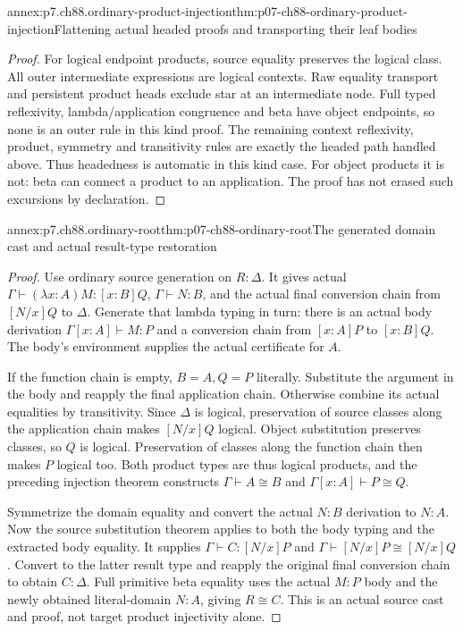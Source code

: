 \begin{annexitem}{annex:p7.ch88.ordinary-product-injection}{thm:p07-ch88-ordinary-product-injection}{Flattening actual headed proofs and transporting their leaf bodies}
\begin{proof}
For logical endpoint products, source equality preserves the logical
class. All outer intermediate expressions are logical contexts.
Raw equality transport and persistent product heads exclude star
at an intermediate node. Full typed reflexivity, lambda/application
congruence and beta have object endpoints, so none is an outer rule
in this kind proof. The remaining context reflexivity, product,
symmetry and transitivity rules are exactly the headed path handled
above. Thus headedness is automatic in this kind case. For object
products it is not: beta can connect a product to an application.
The proof has not erased such excursions by declaration.
\end{proof}
\end{annexitem}

\begin{annexitem}{annex:p7.ch88.ordinary-root}{thm:p07-ch88-ordinary-root}{The generated domain cast and actual result-type restoration}
\begin{proof}
Use ordinary source generation on \(R:\Delta\). It gives actual
\(\Gamma\vdash(\lambda x:A)M:[x:B]Q\),
\(\Gamma\vdash N:B\), and the actual final conversion chain from
\([N/x]Q\) to \(\Delta\). Generate that lambda typing in turn:
there is an actual body derivation \(\Gamma[x:A]\vdash M:P\)
and a conversion chain from \([x:A]P\) to \([x:B]Q\).
The body's environment supplies the actual certificate for \(A\).

If the function chain is empty, \(B=A,Q=P\) literally. Substitute
the argument in the body and reapply the final application chain.
Otherwise combine its actual equalities by transitivity. Since
\(\Delta\) is logical, preservation of source classes along the
application chain makes \([N/x]Q\) logical. Object substitution
preserves classes, so \(Q\) is logical. Preservation of classes
along the function chain then makes \(P\) logical too. Both product
types are thus logical products, and the preceding injection theorem
constructs \(\Gamma\vdash A\cong B\) and
\(\Gamma[x:A]\vdash P\cong Q\).

Symmetrize the domain equality and convert the actual \(N:B\)
derivation to \(N:A\). Now the source substitution theorem applies
to both the body typing and the extracted body equality. It supplies
\(\Gamma\vdash C:[N/x]P\) and
\(\Gamma\vdash[N/x]P\cong[N/x]Q\). Convert to the latter result
type and reapply the original final conversion chain to obtain
\(C:\Delta\). Full primitive beta equality uses the actual
\(M:P\) body and the newly obtained literal-domain \(N:A\),
giving \(R\cong C\). This is an actual source cast and proof,
not target product injectivity alone.


\end{proof}
\end{annexitem}
